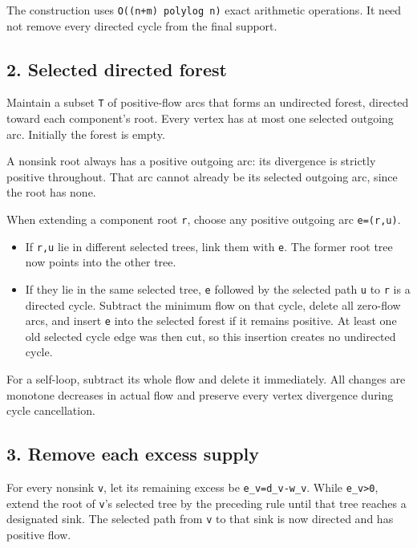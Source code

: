 The construction uses \texttt{O((n+m)\ polylog\ n)} exact arithmetic operations. It need not remove every directed cycle from the final support.

\hypertarget{af-32c0fc642d-selected-directed-forest}{%
\subsection{2. Selected directed forest}\label{af-32c0fc642d-selected-directed-forest}}

Maintain a subset \texttt{T} of positive-flow arcs that forms an undirected forest, directed toward each component's root. Every vertex has at most one selected outgoing arc. Initially the forest is empty.

A nonsink root always has a positive outgoing arc: its divergence is strictly positive throughout. That arc cannot already be its selected outgoing arc, since the root has none.

When extending a component root \texttt{r}, choose any positive outgoing arc \texttt{e=(r,u)}.

\begin{itemize}
\tightlist
\item
  If \texttt{r,u} lie in different selected trees, link them with \texttt{e}. The former root tree now points into the other tree.
\item
  If they lie in the same selected tree, \texttt{e} followed by the selected path \texttt{u} to \texttt{r} is a directed cycle. Subtract the minimum flow on that cycle, delete all zero-flow arcs, and insert \texttt{e} into the selected forest if it remains positive. At least one old selected cycle edge was then cut, so this insertion creates no undirected cycle.
\end{itemize}

For a self-loop, subtract its whole flow and delete it immediately. All changes are monotone decreases in actual flow and preserve every vertex divergence during cycle cancellation.

\hypertarget{af-32c0fc642d-remove-each-excess-supply}{%
\subsection{3. Remove each excess supply}\label{af-32c0fc642d-remove-each-excess-supply}}

For every nonsink \texttt{v}, let its remaining excess be \texttt{e\_v=d\_v-w\_v}. While \texttt{e\_v\textgreater{}0}, extend the root of \texttt{v}'s selected tree by the preceding rule until that tree reaches a designated sink. The selected path from \texttt{v} to that sink is now directed and has positive flow.

